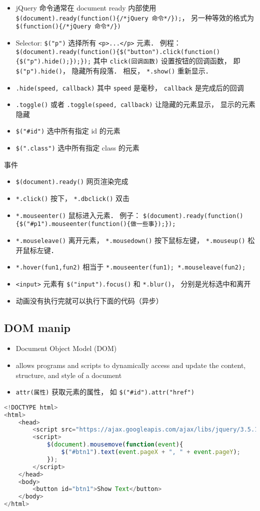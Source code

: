 

\begin{itemize}
\item jQuery 命令通常在 document ready 内部使用 \verb|$(document).ready(function(){/*jQuery 命令*/});|， 另一种等效的格式为 \verb|$(function(){/*jQuery 命令*/})|
\item Selector: \verb|$("p")| 选择所有 \verb|<p>...</p>| 元素． 例程： \verb|$(document).ready(function(){$("button").click(function(){$("p").hide();});});| 其中 \verb|click(回调函数)| 设置按钮的回调函数， 即 \verb|$("p").hide()|， 隐藏所有段落． 相反， \verb|*.show()| 重新显示．
\item \verb|.hide(speed, callback)| 其中 \verb|speed| 是毫秒， \verb|callback| 是完成后的回调
\item \verb|.toggle()| 或者 \verb|.toggle(speed, callback)| 让隐藏的元素显示， 显示的元素隐藏
\item \verb|$("#id")| 选中所有指定 id 的元素
\item \verb|$(".class")| 选中所有指定 class 的元素
\end{itemize}

事件
\begin{itemize}
\item \verb|$(document).ready()| 网页渲染完成
\item \verb|*.click()| 按下， \verb|*.dbclick()| 双击
\item \verb|*.mouseenter()| 鼠标进入元素． 例子： \verb|$(document).ready(function(){$("#p1").mouseenter(function(){做一些事});});|
\item \verb|*.mouseleave()| 离开元素， \verb|*.mousedown()| 按下鼠标左键， \verb|*.mouseup()| 松开鼠标左键．
\item \verb|*.hover(fun1,fun2)| 相当于 \verb|*.mouseenter(fun1); *.mouseleave(fun2);|
\item \verb|<input>| 元素有 \verb|$("input").focus()| 和 \verb|*.blur()|， 分别是光标选中和离开
\item 动画没有执行完就可以执行下面的代码（异步）
\end{itemize}

\subsection{DOM manip}
\begin{itemize}
\item Document Object Model (DOM)
\item allows programs and scripts to dynamically access and update the content, structure, and style of a document
\item \verb|attr(属性)| 获取元素的属性， 如 \verb|$("#id").attr("href")|
\end{itemize}
\begin{lstlisting}[language=js]
<!DOCTYPE html>
<html>
	<head>
		<script src="https://ajax.googleapis.com/ajax/libs/jquery/3.5.1/jquery.min.js"></script>
		<script>
			$(document).mousemove(function(event){
				$("#btn1").text(event.pageX + ", " + event.pageY);
			});
		</script>
	</head>
	<body>
		<button id="btn1">Show Text</button>
	</body>
</html>
\end{lstlisting}
